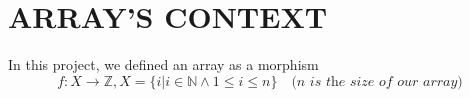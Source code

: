 \section{ARRAY'S CONTEXT}

In this project, we defined an array as a morphism 
$$ f : X \to \mathbb{Z} , X = \{i | i \in \mathbb{N} \land 1 \leq i \leq n\} \quad \textit{(n is the size of our array)}$$
